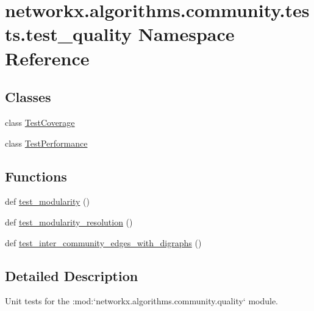 \hypertarget{namespacenetworkx_1_1algorithms_1_1community_1_1tests_1_1test__quality}{}\section{networkx.\+algorithms.\+community.\+tests.\+test\+\_\+quality Namespace Reference}
\label{namespacenetworkx_1_1algorithms_1_1community_1_1tests_1_1test__quality}
\subsection*{Classes}
\begin{DoxyCompactItemize}
\item 
class \hyperlink{classnetworkx_1_1algorithms_1_1community_1_1tests_1_1test__quality_1_1TestCoverage}{Test\+Coverage}
\item 
class \hyperlink{classnetworkx_1_1algorithms_1_1community_1_1tests_1_1test__quality_1_1TestPerformance}{Test\+Performance}
\end{DoxyCompactItemize}
\subsection*{Functions}
\begin{DoxyCompactItemize}
\item 
def \hyperlink{namespacenetworkx_1_1algorithms_1_1community_1_1tests_1_1test__quality_a49f37ab9b4fd167d3f94ea82ffa63b15}{test\+\_\+modularity} ()
\item 
def \hyperlink{namespacenetworkx_1_1algorithms_1_1community_1_1tests_1_1test__quality_a5620e881d585a3e4f0fa51c1b77c2cce}{test\+\_\+modularity\+\_\+resolution} ()
\item 
def \hyperlink{namespacenetworkx_1_1algorithms_1_1community_1_1tests_1_1test__quality_a1b4555534ea6115b7bd3bdb062cb6453}{test\+\_\+inter\+\_\+community\+\_\+edges\+\_\+with\+\_\+digraphs} ()
\end{DoxyCompactItemize}


\subsection{Detailed Description}
\begin{DoxyVerb}Unit tests for the :mod:`networkx.algorithms.community.quality`
module.\end{DoxyVerb}
 

